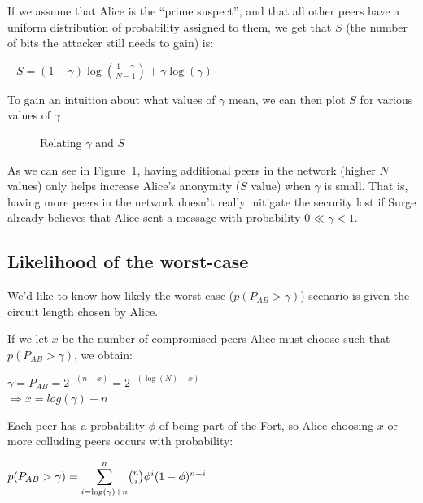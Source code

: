 \documentclass[twocolumn,11pt,english]{article}
\begin{document}
If we assume that Alice is the ``prime suspect'', and that all other peers have a uniform distribution of probability assigned to them, we get that $S$ (the number of bits the attacker still needs to gain) is:

\begin{center}
$-S = (1 - \gamma) \log(\frac{1-\gamma}{N - 1}) + \gamma \log(\gamma)$
\end{center}

To gain an intuition about what values of $\gamma$ mean, we can then plot $S$ for various values of $\gamma$
\begin{figure}[h!]
  \caption{Relating $\gamma$ and $S$}
  \label{gammaS}
\end{figure}

As we can see in Figure~\ref{gammaS}, having additional peers in the network (higher $N$ values) only helps increase Alice's anonymity ($S$ value) when $\gamma$ is small. That is, having more peers in the network doesn't really mitigate the security lost if Surge already believes that Alice sent a message with probability $0 \ll \gamma < 1 $. 

\subsection{Likelihood of the worst-case}
\label{sec:worstcase}
We'd like to know how likely the worst-case ($p(P_{AB} > \gamma)$) scenario is given the circuit length chosen by Alice. 

If we let $x$ be the number of compromised peers Alice must choose such that $p(P_{AB} > \gamma)$, we obtain: 
\begin{center}
$\gamma = P_{AB} = 2^{-(n - x)} = 2^{-(\log(N) - x)}$
\\ $ \Rightarrow x = log( \gamma ) + n$
\end{center}
Each peer has a probability $\phi$ of being part of the Fort, so Alice choosing $x$ or more colluding peers occurs with probability:
\begin{center}
 $p(P_{AB} > \gamma) = \mathlarger{\sum}\limits_{i=\log(\gamma) + n}^n {n \choose i} \phi^i (1 - \phi )^{n-i}$

\end{center}
\end{document}
